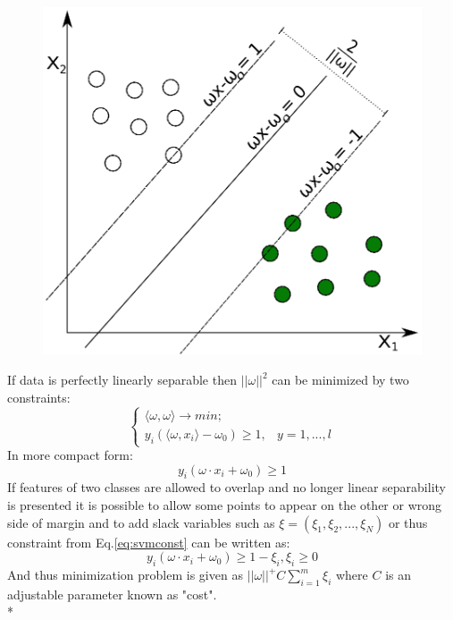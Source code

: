 \begin{figure}[h!]
\centering
\includegraphics[width=1\textwidth]{figures/chap3/svm2.eps}
\caption{}
\label{figure:svm2}
\end{figure}
If data is perfectly linearly separable then $||\omega||^2$ can be minimized by two constraints: 
\begin{equation}
\begin{cases} \langle \omega,\omega\rangle \rightarrow min;\\ y_i(\langle \omega,x_i\rangle-\omega_0)\geq1 , &  y=1,...,l  \end{cases}
\end{equation}
In more compact form:
\begin{equation}\label{eq:svmconst}
y_i(\omega\cdot x_i+\omega_0)\geq 1
\end{equation}
If features of two classes are allowed to overlap and no longer linear separability is presented it is possible to allow some points to appear on the other or wrong side of margin and to add slack variables such as $\xi=(\xi_1,\xi_2,...,\xi_N)$ or thus constraint from Eq.\ref{eq:svmconst} can be written as: 
\begin{equation}\label{eq:svmconst}
y_i(\omega\cdot x_i+\omega_0)\geq 1-\xi_i, \xi_i\geq 0
\end{equation}
And thus minimization problem is given as $||\omega||^+C\sum_{i=1}^m\xi_i$ where $C$ is an adjustable parameter known as "cost". \\* 
